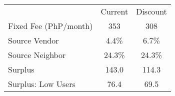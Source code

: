 \begin{tabular}{lcc}
& Current & Discount \\
Fixed Fee (PhP/month) &353&308\\
Source Vendor &4.4\% &6.7\% \\
Source Neighbor &24.3\% &24.3\% \\
 Surplus  &143.0&114.3 \\
 Surplus: Low Users  &76.4&69.5 \\
\end{tabular}
